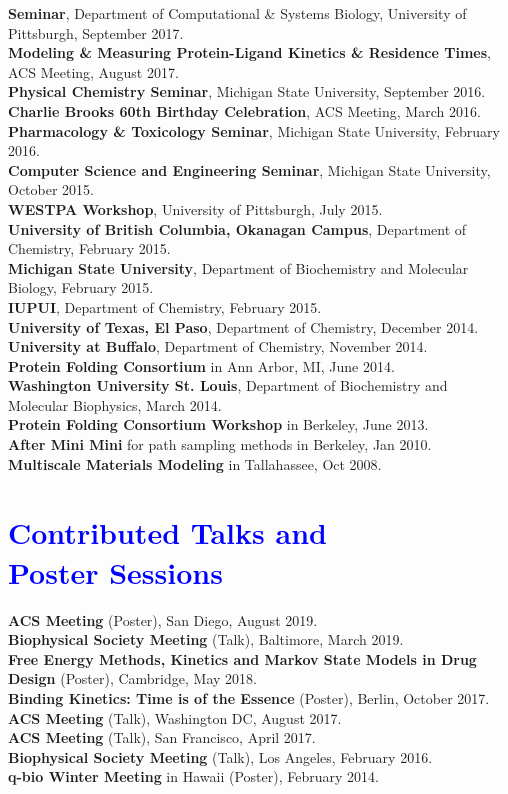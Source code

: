 \documentclass[margin,line]{res}
\begin{document}
\begin{resume}
{\bf Seminar}, Department of Computational \& Systems Biology, University of Pittsburgh, September 2017. \\
{\bf Modeling \& Measuring Protein-Ligand Kinetics \& Residence Times}, ACS Meeting, August 2017. \\
{\bf Physical Chemistry Seminar}, Michigan State University, September 2016. \\
{\bf Charlie Brooks 60th Birthday Celebration}, ACS Meeting, March 2016. \\
{\bf Pharmacology \& Toxicology Seminar}, Michigan State University, February 2016. \\
{\bf Computer Science and Engineering Seminar}, Michigan State University, October 2015. \\
{\bf WESTPA Workshop}, University of Pittsburgh, July 2015. \\
{\bf University of British Columbia, Okanagan Campus}, Department of Chemistry, February 2015. \\
{\bf Michigan State University}, Department of Biochemistry and Molecular Biology, February 2015. \\
{\bf IUPUI}, Department of Chemistry, February 2015. \\
{\bf University of Texas, El Paso}, Department of Chemistry, December 2014. \\
{\bf University at Buffalo}, Department of Chemistry, November 2014. \\
{\bf Protein Folding Consortium} in Ann Arbor, MI, June 2014. \\
{\bf Washington University St. Louis}, Department of Biochemistry and Molecular Biophysics, March 2014. \\
{\bf Protein Folding Consortium Workshop} in Berkeley, June 2013. \\
{\bf After Mini Mini} for path sampling methods in Berkeley, Jan 2010. \\
{\bf Multiscale Materials Modeling} in Tallahassee, Oct 2008. \\

\section{\sc \textcolor{blue}{ Contributed Talks and \\ Poster Sessions}}

{\bf ACS Meeting} (Poster), San Diego, August 2019. \\
{\bf Biophysical Society Meeting} (Talk), Baltimore, March 2019.\\
{\bf Free Energy Methods, Kinetics and Markov State Models in Drug Design} (Poster), Cambridge, May 2018. \\
{\bf Binding Kinetics: Time is of the Essence} (Poster), Berlin, October 2017.\\
{\bf ACS Meeting} (Talk), Washington DC, August 2017. \\
{\bf ACS Meeting} (Talk), San Francisco, April 2017. \\
{\bf Biophysical Society Meeting} (Talk), Los Angeles, February 2016. \\
{\bf q-bio Winter Meeting} in Hawaii (Poster), February 2014. \\


\end{resume}
\end{document}
